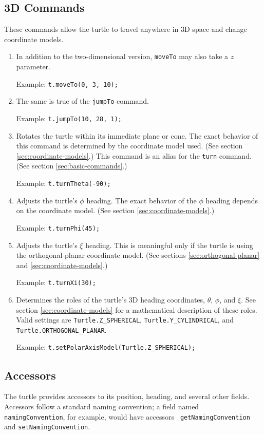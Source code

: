 \documentclass{article}
\newenvironment{commandtable}
  {\begin{enumerate}}
  {\end{enumerate}}
\def\command[#1]{\item[\tt #1]}
\def\example[#1]{\par Example: {\tt #1}}
\begin{document}
    \subsection{3D Commands}
      \label{sec:3d-commands}

      These commands allow the turtle to travel anywhere in 3D space and change
      coordinate models.

      \begin{commandtable}
	\command[moveTo]
	In addition to the two-dimensional version, {\tt moveTo} may also take a
	$z$ parameter.
	\example[t.moveTo(0, 3, 10);]

	\command[jumpTo]
	The same is true of the {\tt jumpTo} command.
	\example[t.jumpTo(10, 28, 1);]

	\command[turnTheta]
	Rotates the turtle within its immediate plane or cone. The exact
	behavior of this command is determined by the coordinate model used.
	(See section \ref{sec:coordinate-models}.) This command is an alias for
	the {\tt turn} command. (See section \ref{sec:basic-commands}.)
	\example[t.turnTheta(-90);]

	\command[turnPhi]
	Adjusts the turtle's $\phi$ heading. The exact behavior of the $\phi$
	heading depends on the coordinate model. (See section
	\ref{sec:coordinate-models}.)
	\example[t.turnPhi(45);]

	\command[turnXi]
	Adjusts the turtle's $\xi$ heading. This is meaningful only if the
	turtle is using the orthogonal-planar coordinate model. (See sections
	\ref{sec:orthogonal-planar} and \ref{sec:coordinate-models}.)
	\example[t.turnXi(30);]

	\command[setPolarAxisModel]
	Determines the roles of the turtle's 3D heading coordinates, $\theta$,
	$\phi$, and $\xi$. See section \ref{sec:coordinate-models} for a
	mathematical description of these roles. Valid settings are
	\verb|Turtle.Z_SPHERICAL|, \verb|Turtle.Y_CYLINDRICAL|, and
	\verb|Turtle.ORTHOGONAL_PLANAR|.
	\example[t.setPolarAxisModel(Turtle.Z\_SPHERICAL);]
      \end{commandtable}

    \subsection{Accessors}
      \label{sec:accessors}

      The turtle provides accessors to its position, heading, and several other
      fields. Accessors follow a standard naming convention; a field named {\tt
      namingConvention}, for example, would have accessors {\tt
      getNamingConvention} and {\tt setNamingConvention}.
\end{document}
